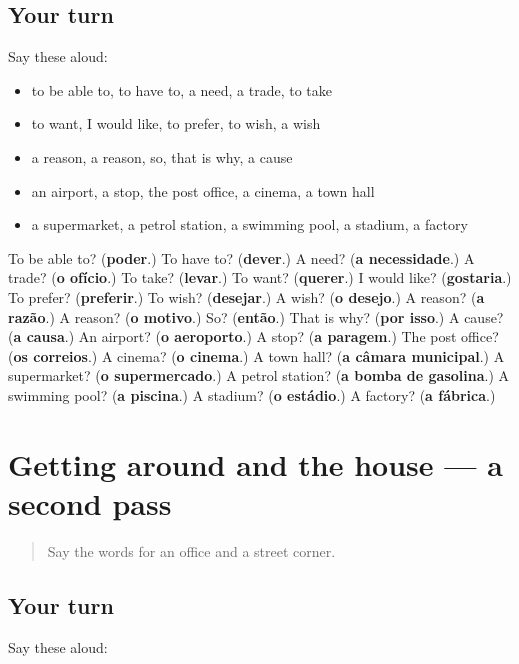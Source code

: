 \subsection*{Your turn}
Say these aloud:

\begin{itemize}
\raggedright
  \item to be able to, to have to, a need, a trade, to take
  \item to want, I would like, to prefer, to wish, a wish
  \item a reason, a reason, so, that is why, a cause
  \item an airport, a stop, the post office, a cinema, a town hall
  \item a supermarket, a petrol station, a swimming pool, a stadium, a factory
\end{itemize}

\begin{tcolorbox}[breakable,colback=teal!4,colframe=teal!35!black,title={Before you move on}]
To be able to? (\textbf{poder}.) To have to? (\textbf{dever}.) A need? (\textbf{a necessidade}.) A trade? (\textbf{o ofício}.) To take? (\textbf{levar}.) To want? (\textbf{querer}.) I would like? (\textbf{gostaria}.) To prefer? (\textbf{preferir}.) To wish? (\textbf{desejar}.) A wish? (\textbf{o desejo}.) A reason? (\textbf{a razão}.) A reason? (\textbf{o motivo}.) So? (\textbf{então}.) That is why? (\textbf{por isso}.) A cause? (\textbf{a causa}.) An airport? (\textbf{o aeroporto}.) A stop? (\textbf{a paragem}.) The post office? (\textbf{os correios}.) A cinema? (\textbf{o cinema}.) A town hall? (\textbf{a câmara municipal}.) A supermarket? (\textbf{o supermercado}.) A petrol station? (\textbf{a bomba de gasolina}.) A swimming pool? (\textbf{a piscina}.) A stadium? (\textbf{o estádio}.) A factory? (\textbf{a fábrica}.)
\end{tcolorbox}
\section[(dialogue)]{Getting around and the house — a second pass}

\label{lesson:PT-R92-second-pass-getting-around-and-the-house}



\begin{quote}
Say the words for an office and a street corner.
\end{quote}

\subsection*{Your turn}
Say these aloud:

